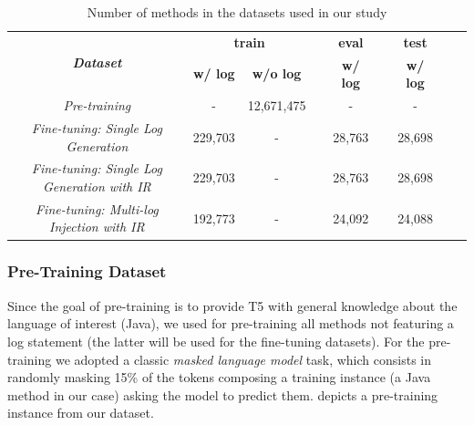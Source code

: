 \begin{table}[h]
	\centering
	\caption{Number of methods in the datasets used in our study}
		\label{tab:ds-summary-1}
	\begin{tabular}{ccccccccc}
		\toprule
		\multirow{2}{*}{\textit{\textbf{Dataset}}} & \multicolumn{2}{c}{\textbf{train}} & \textbf{} & \textbf{eval} & \textbf{} & \textbf{test}  \\ \cline{2-3} \cline{5-5} \cline{7-7} 
		& \textbf{w/ log} & \textbf{w/o log} & \textbf{} & \textbf{w/ log} & \textbf{} & \textbf{w/ log} \\ \midrule
		\textit{Pre-training}              & -               &      12,671,475  &           & -               &           &  -               \\
		\textit{Fine-tuning: Single Log Generation}               & 229,703         & -                &           & 28,763          &           & 28,698          \\
		\textit{Fine-tuning: Single Log Generation with IR}               & 229,703         & -                &           & 28,763          &           & 28,698          \\
		\textit{Fine-tuning: Multi-log Injection with IR}               & 192,773         & -                &           & 24,092         &           & 24,088          \\
		\bottomrule
	\end{tabular}
\end{table}

\subsubsection{Pre-Training Dataset}
\label{sub:pretraining}
Since the goal of pre-training is to provide T5 with general knowledge about the language of interest (\ie Java), we used for pre-training all methods not featuring a log statement (the latter will be used for the fine-tuning datasets). For the pre-training we adopted a classic \emph{masked language model} task, which consists in randomly masking 15\% of the tokens composing a training instance (\ie a Java method in our case) asking the model to predict them.  depicts a pre-training instance from our dataset.



